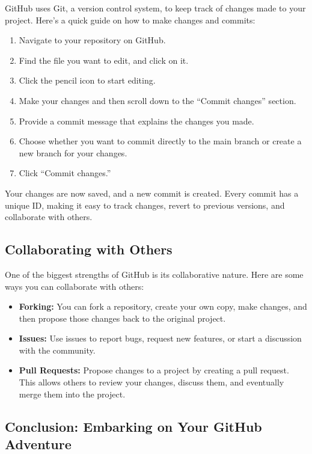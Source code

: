 \documentclass[a4paper,12pt]{book}
\begin{document}
GitHub uses Git, a version control system, to keep track of changes made to your project. Here’s a quick guide on how to make changes and commits:

\begin{enumerate}
    \item Navigate to your repository on GitHub.
    \item Find the file you want to edit, and click on it.
    \item Click the pencil icon to start editing.
    \item Make your changes and then scroll down to the “Commit changes” section.
    \item Provide a commit message that explains the changes you made.
    \item Choose whether you want to commit directly to the main branch or create a new branch for your changes.
    \item Click “Commit changes.”
\end{enumerate}

Your changes are now saved, and a new commit is created. Every commit has a unique ID, making it easy to track changes, revert to previous versions, and collaborate with others.

\subsection*{Collaborating with Others}

One of the biggest strengths of GitHub is its collaborative nature. Here are some ways you can collaborate with others:

\begin{itemize}
    \item \textbf{Forking:} You can fork a repository, create your own copy, make changes, and then propose those changes back to the original project.
    \item \textbf{Issues:} Use issues to report bugs, request new features, or start a discussion with the community.
    \item \textbf{Pull Requests:} Propose changes to a project by creating a pull request. This allows others to review your changes, discuss them, and eventually merge them into the project.
\end{itemize}

\subsection*{Conclusion: Embarking on Your GitHub Adventure}
\end{document}
